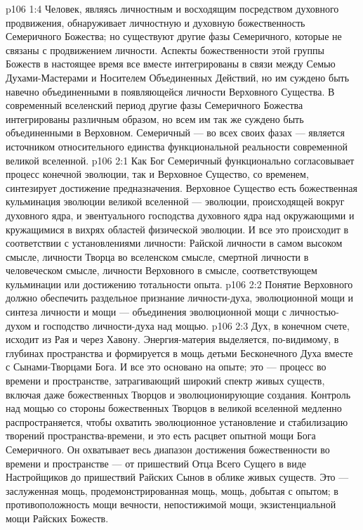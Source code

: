 \vs p106 1:4 Человек, являясь личностным и восходящим посредством духовного продвижения, обнаруживает личностную и духовную божественность Семеричного Божества; но существуют другие фазы Семеричного, которые не связаны с продвижением личности. Аспекты божественности этой группы Божеств в настоящее время все вместе интегрированы в связи между Семью Духами\hyp{}Мастерами и Носителем Объединенных Действий, но им суждено быть навечно объединенными в появляющейся личности Верховного Существа. В современный вселенский период другие фазы Семеричного Божества интегрированы различным образом, но всем им так же суждено быть объединенными в Верховном. Семеричный --- во всех своих фазах --- является источником относительного единства функциональной реальности современной великой вселенной.
\vs p106 2:1 Как Бог Семеричный функционально согласовывает процесс конечной эволюции, так и Верховное Существо, со временем, синтезирует достижение предназначения. Верховное Существо есть божественная кульминация эволюции великой вселенной --- эволюции, происходящей вокруг духовного ядра, и эвентуального господства духовного ядра над окружающими и кружащимися в вихрях областей физической эволюции. И все это происходит в соответствии с установлениями личности: Райской личности в самом высоком смысле, личности Творца во вселенском смысле, смертной личности в человеческом смысле, личности Верховного в смысле, соответствующем кульминации или достижению тотальности опыта.
\vs p106 2:2 \pc Понятие Верховного должно обеспечить раздельное признание личности\hyp{}духа, эволюционной мощи и синтеза личности и мощи --- объединения эволюционной мощи с личностью\hyp{}духом и господство личности\hyp{}духа над мощью.
\vs p106 2:3 Дух, в конечном счете, исходит из Рая и через Хавону. Энергия\hyp{}материя выделяется, по\hyp{}видимому, в глубинах пространства и формируется в мощь детьми Бесконечного Духа вместе с Сынами\hyp{}Творцами Бога. И все это основано на опыте; это --- процесс во времени и пространстве, затрагивающий широкий спектр живых существ, включая даже божественных Творцов и эволюционирующие создания. Контроль над мощью со стороны божественных Творцов в великой вселенной медленно распространяется, чтобы охватить эволюционное установление и стабилизацию творений пространства\hyp{}времени, и это есть расцвет опытной мощи Бога Семеричного. Он охватывает весь диапазон достижения божественности во времени и пространстве --- от пришествий Отца Всего Сущего в виде Настройщиков до пришествий Райских Сынов в облике живых существ. Это --- заслуженная мощь, продемонстрированная мощь, мощь, добытая с опытом; в противоположность мощи вечности, непостижимой мощи, экзистенциальной мощи Райских Божеств.
